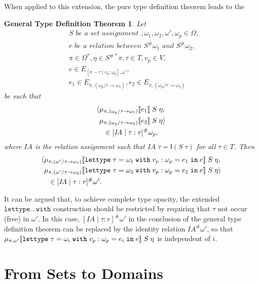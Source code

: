 \documentclass[sigplan,screen,nonacm,balance=false]{acmart}
\theoremstyle{plain}
\DeclarePairedDelimiter{\pair}{\langle}{\rangle}
\DeclarePairedDelimiter{\interp}{\llbracket}{\rrbracket}
\newcommand{\lettype}{\mathtt{lettype}}
\newcommand{\with}{\mathtt{with}}
\newcommand{\letwith}[6]{\mathtt{lettype} \; #1 = #2 \; \mathtt{with} \; #3 : #4 = #5 \; \mathtt{in} \; #6}
\newcommand{\IA}{\mathit{IA}}
\newcommand{\Id}{\mathsf{I}}
\begin{document}
When applied to this extension, the pure type definition theorem leads to the

\newtheorem*{gentypedef}{General Type Definition Theorem}
\begin{gentypedef}
Let
%
\begin{align*}
  & S \textit{ be a set assignment }, \omega_1, \omega_2, \omega', \omega_p \in \Omega, \\
  & r \textit{ be a relation between } S^\# \omega_1 \textit{ and } S^\# \omega_2, \\
  & \pi \in \Omega^*, \eta \in S^{\#*} \pi, \tau \in T, v_p \in V, \\
  & e \in E_{[\pi - \tau \mid v_p : \omega_p], \omega'}, \\
  & e_1 \in E_{\pi, (\omega_p/\tau \to \omega_1)}, e_2 \in E_{\pi, (\omega_p/\tau \to \omega_2)}
\end{align*}
%
be such that
%
\begin{align*}
  &\pair{\mu_{\pi, (\omega_p/\tau \to \omega_1)} \interp{e_1} \; S \; \eta, \\
  &\phantom{\langle} \mu_{\pi, (\omega_p/\tau \to \omega_2)} \interp{e_2} \; S \; \eta} \\
  &\quad \in [\IA \mid \tau : r]^\# \omega_p,
\end{align*}
%
where $\IA$ is the relation assignment such that $\IA \; \tau = \Id(S \; \tau)$ for all $\tau \in T$.
Then
%
\begin{align*}
  &\pair{\mu_{\pi, (\omega'/\tau \to \omega_1)} \interp{\letwith{\tau}{\omega_1}{v_p}{\omega_p}{e_1}{e}} \; S \; \eta, \\
  &\phantom{\langle} \mu_{\pi, (\omega'/\tau \to \omega_2)} \interp{\letwith{\tau}{\omega_2}{v_p}{\omega_p}{e_2}{e}} \; S \; \eta} \\
  &\quad \in [\IA \mid \tau : r]^\# \omega'.
\end{align*}
\end{gentypedef}

It can be argued that, to achieve complete type opacity, the extended $\lettype \dots \with$ construction should be restricted by requiring that $\tau$ not occur (free) in $\omega'$.
In this case, $[\IA \mid \tau : r]^\# \omega'$ in the conclusion of the general type definition theorem can be replaced by the identity relation $\IA^\# \omega'$, so that
$\mu_{\pi, \omega'} \interp{\letwith{\tau}{\omega_i}{v_p}{\omega_p}{e_i}{e}} \; S \; \eta$
is independent of $i$.

\section{From Sets to Domains}
\end{document}
